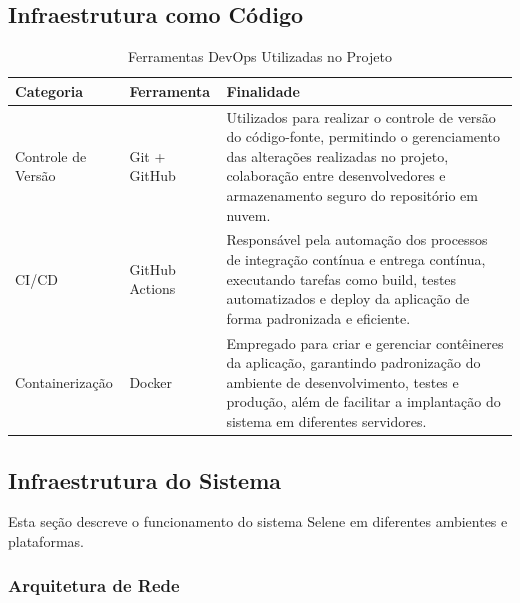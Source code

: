 \documentclass[11pt,a4paper]{article}
\begin{document}
\subsection{Infraestrutura como Código}

\begin{table}[H]
\centering
\caption{Ferramentas DevOps Utilizadas no Projeto}
\label{tab:devops-tools}

\renewcommand{\arraystretch}{1.5} %

\begin{tabular}{|>{\centering\arraybackslash}m{4cm}
                |>{\centering\arraybackslash}m{4cm}
                |m{8cm}|}
\hline

\rowcolor[HTML]{D9EAF7}
\textbf{Categoria} &
\textbf{Ferramenta} &
\textbf{Finalidade} \\

\hline

Controle de Versão &
Git + GitHub &
Utilizados para realizar o controle de versão do código-fonte, permitindo o gerenciamento das alterações realizadas no projeto, colaboração entre desenvolvedores e armazenamento seguro do repositório em nuvem. \\

\hline

CI/CD &
GitHub Actions &
Responsável pela automação dos processos de integração contínua e entrega contínua, executando tarefas como build, testes automatizados e deploy da aplicação de forma padronizada e eficiente. \\

\hline

Containerização &
Docker &
Empregado para criar e gerenciar contêineres da aplicação, garantindo padronização do ambiente de desenvolvimento, testes e produção, além de facilitar a implantação do sistema em diferentes servidores. \\

\hline

\end{tabular}
\end{table}

\subsection{Infraestrutura do Sistema}

Esta seção descreve o funcionamento do sistema Selene em diferentes ambientes e plataformas.

\subsubsection{Arquitetura de Rede}
\end{document}
